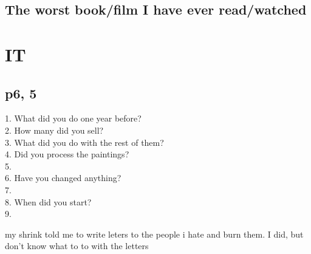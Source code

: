 \documentclass[a4paper,12pt]{article}
\begin{document}
\subsection{The worst book/film I have ever read/watched}
\section{IT}
\subsection{p6, 5}
1. What did you do one year before?\\
2. How many did you sell? \\
3. What did you do with the rest of them? \\
4. Did you process the paintings? \\
5. \\
6. Have you changed anything?\\
7. \\
8. When did you start? \\
9. 

my shrink told me to write leters to the people i hate and burn them. I did, but don't know what to to with the letters \\
\end{document}
